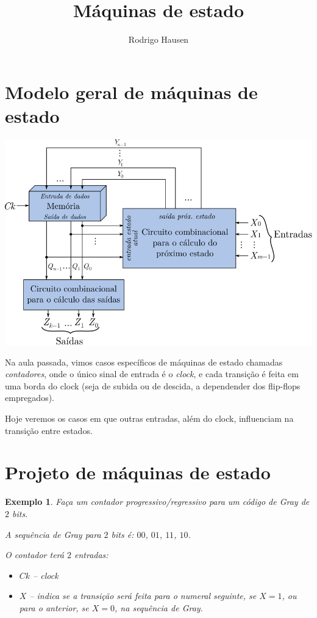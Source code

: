\documentclass[a4paper,12pt,notitlepage]{article}
\title{Máquinas de estado}
\author{Rodrigo Hausen}
\date{}
\newtheorem{ex}{Exemplo}
\begin{document}
\maketitle

\section{Modelo geral de máquinas de estado}

\begin{center}
\includegraphics[scale=1.3]{images/state_machine_general}
\end{center}

Na aula passada, vimos casos específicos de máquinas de estado chamadas
\emph{contadores}, onde o único sinal de entrada é o \emph{clock}, e cada
transição é feita em uma borda do clock (seja de subida ou de descida, a
dependender dos flip-flops empregados).

Hoje veremos os casos em que outras entradas, além do clock, influenciam
na transição entre estados.

\section{Projeto de máquinas de estado}

\begin{ex}
Faça um contador progressivo/regressivo para um código de Gray de $2$ bits.

A sequência de Gray para $2$ bits é: $00$, $01$, $11$, $10$.

O contador terá $2$ entradas:
\begin{itemize}
\item $Ck$ -- clock
\item $X$ -- indica se a transição será feita para o numeral \emph{seguinte},
             se $X = 1$, ou para o \emph{anterior}, se $X = 0$, na sequência
             de Gray.
\end{itemize}
\end{ex}
\end{document}
